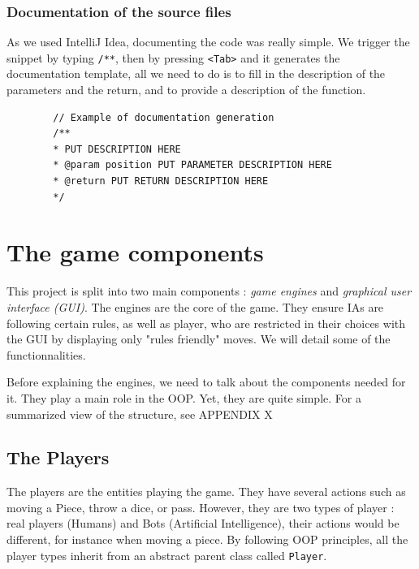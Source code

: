 \documentclass[english, 11pt, titlepage]{article}
\begin{document}
    \subsubsection{Documentation of the source files}
    As we used IntelliJ Idea, documenting the code was really simple. We trigger the snippet by typing \verb|/**|, then by pressing \verb|<Tab>| and it generates the documentation template, all we need to do is to fill in the description of the parameters and the return, and to provide a description of the function.

    \begin{lstlisting}
        // Example of documentation generation
        /**
        * PUT DESCRIPTION HERE
        * @param position PUT PARAMETER DESCRIPTION HERE
        * @return PUT RETURN DESCRIPTION HERE
        */
    \end{lstlisting}

    \section{The game components}
    This project is split into two main components : \emph{game engines} and \emph{graphical user interface (GUI)}. The engines are the core of the game. They ensure IAs are following certain rules, as well as player, who are restricted in their choices with the GUI by displaying only "rules friendly" moves. We will detail some of the functionnalities.

    Before explaining the engines, we need to talk about the components needed for it. They play a main role in the OOP. Yet, they are quite simple. For a summarized view of the structure, see APPENDIX X

    \subsection{The Players}
    The players are the entities playing the game. They have several actions such as moving a Piece, throw a dice, or pass. However, they are two types of player : real players (Humans) and Bots (Artificial Intelligence), their actions would be different, for instance when moving a piece. By following OOP principles, all the player types inherit from an abstract parent class called \verb|Player|. 
\end{document}
